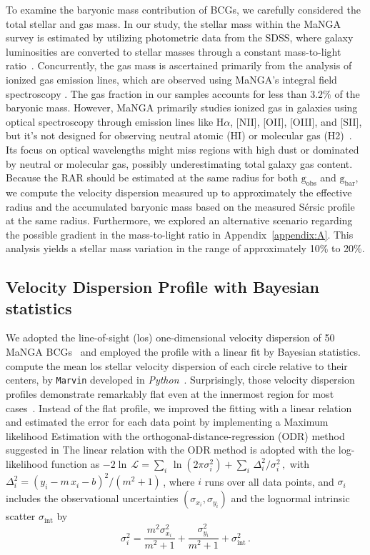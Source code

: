 \documentclass[a4paper, two-column, twocolappendix]{aa}
\newcommand{\percent}{\ensuremath{\%}}
\newcommand{\gbar}{\mathrm{g}_\mathrm{bar}}
\newcommand{\gobs}{\mathrm{g}_\mathrm{obs}}
\begin{document}
To examine the baryonic mass contribution of BCGs, we carefully considered the total stellar and gas mass.
In our study, the stellar mass within the MaNGA survey is estimated by utilizing photometric data from the SDSS, where galaxy luminosities are converted to stellar masses through a constant mass-to-light ratio~\citep{Law21}. Concurrently, the gas mass is ascertained primarily from the analysis of ionized gas emission lines, which are observed using MaNGA's integral field spectroscopy \citep{Bundy15}.
The gas fraction in our samples accounts for less than $3.2\percent$ of the baryonic mass. 
However, MaNGA primarily studies ionized gas in galaxies using optical spectroscopy through emission lines like H$\alpha$, [NII], [OII], [OIII], and [SII], but it's not designed for observing neutral atomic (HI) or molecular gas (H2)~\citep{Bundy15}. Its focus on optical wavelengths might miss regions with high dust or dominated by neutral or molecular gas, possibly underestimating total galaxy gas content.
Because the RAR should be estimated at the same radius for both $\gobs$ and $\gbar$,
we compute the velocity dispersion measured up to approximately the effective radius and the accumulated baryonic mass based on the measured Sérsic profile at the same radius.
Furthermore, we explored an alternative scenario regarding the possible gradient in the mass-to-light ratio in Appendix~\ref{appendix:A}. This analysis yields a stellar mass variation in the range of approximately 10\% to 20\%.
 

    \subsection{Velocity Dispersion Profile with Bayesian statistics}\label{sec:Bayesian}
We adopted the line-of-sight (los) one-dimensional velocity dispersion of 50 MaNGA BCGs~\citep{Tian21a} and 
 employed the profile with a linear fit by Bayesian statistics.
\cite{Tian21a} compute the mean los stellar velocity dispersion of each circle relative to their centers,  
 by \texttt{Marvin} developed in \textit{Python}~\citep{Cherinka19}.
Surprisingly, those velocity dispersion profiles demonstrate remarkably flat even at the innermost region for most cases~\citep{Tian21a}.
Instead of the flat profile, we improved the fitting with a linear relation 
 and estimated the error for each data point by implementing a Maximum likelihood Estimation with 
 the orthogonal-distance-regression (ODR) method suggested in \cite{Lelli19, Tian21b, Tian21a}
The linear relation with the ODR method is adopted with the log-likelihood function as
$-2\ln\,\mathcal{L}=\sum_{i}\,\ln{(2\pi\sigma^2_{i})}+\sum_{i}\,\Delta_i^2/\sigma^2_{i}\,,$
 with $\Delta_i^2=(y_i-m\,x_i-b)^2/(m^2+1)\,$, 
 where $i$ runs over all data points, and $\sigma_i$ includes the
 observational uncertainties $(\sigma_{x_i}, \sigma_{y_i})$ and
    the lognormal intrinsic scatter $\sigma_\mathrm{int}$ by
\begin{equation}\label{eq:sigma}
     \sigma^2_{i}=\frac{m^2\sigma^2_{x_i}}{m^2+1}+\frac{\sigma^2_{y_i}}{m^2+1}+\sigma_\mathrm{int}^2\,.
\end{equation}
\end{document}
